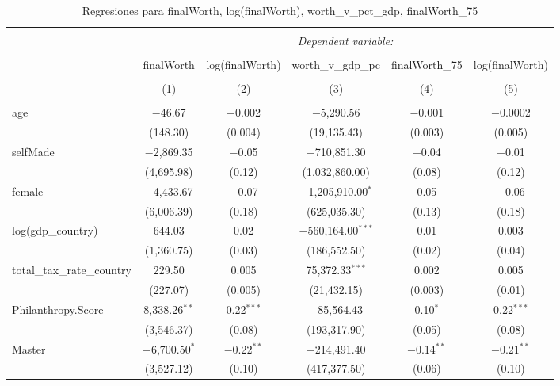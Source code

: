 
\begin{table}[!htbp] \centering 
  \caption{Regresiones para finalWorth, log(finalWorth), worth_v_pct_gdp, finalWorth_75} 
  \label{tab:finalWorth_regresiones} 
\footnotesize 
\begin{tabular}{@{\extracolsep{1pt}}lccccc} 
\\[-1.8ex]\hline 
\hline \\[-1.8ex] 
 & \multicolumn{5}{c}{\textit{Dependent variable:}} \\ 
\cline{2-6} 
\\[-1.8ex] & finalWorth & log(finalWorth) & worth\_v\_gdp\_pc & finalWorth\_75 & log(finalWorth) \\ 
\\[-1.8ex] & (1) & (2) & (3) & (4) & (5)\\ 
\hline \\[-1.8ex] 
 age & $-$46.67 & $-$0.002 & $-$5,290.56 & $-$0.001 & $-$0.0002 \\ 
  & (148.30) & (0.004) & (19,135.43) & (0.003) & (0.005) \\ 
  selfMade & $-$2,869.35 & $-$0.05 & $-$710,851.30 & $-$0.04 & $-$0.01 \\ 
  & (4,695.98) & (0.12) & (1,032,860.00) & (0.08) & (0.12) \\ 
  female & $-$4,433.67 & $-$0.07 & $-$1,205,910.00$^{*}$ & 0.05 & $-$0.06 \\ 
  & (6,006.39) & (0.18) & (625,035.30) & (0.13) & (0.18) \\ 
  log(gdp\_country) & 644.03 & 0.02 & $-$560,164.00$^{***}$ & 0.01 & 0.003 \\ 
  & (1,360.75) & (0.03) & (186,552.50) & (0.02) & (0.04) \\ 
  total\_tax\_rate\_country & 229.50 & 0.005 & 75,372.33$^{***}$ & 0.002 & 0.005 \\ 
  & (227.07) & (0.005) & (21,432.15) & (0.003) & (0.01) \\ 
  Philanthropy.Score & 8,338.26$^{**}$ & 0.22$^{***}$ & $-$85,564.43 & 0.10$^{*}$ & 0.22$^{***}$ \\ 
  & (3,546.37) & (0.08) & (193,317.90) & (0.05) & (0.08) \\ 
  Master & $-$6,700.50$^{*}$ & $-$0.22$^{**}$ & $-$214,491.40 & $-$0.14$^{**}$ & $-$0.21$^{**}$ \\ 
  & (3,527.12) & (0.10) & (417,377.50) & (0.06) & (0.10) \\ 

\end{tabular}
\end{table}
